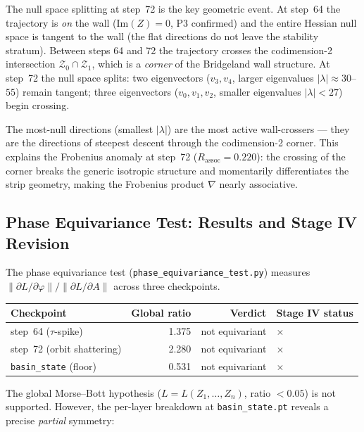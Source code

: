 \documentclass[11pt]{amsart}
\begin{document}
The null space splitting at step~72 is the key geometric event.
At step~64 the trajectory is \emph{on} the wall (Im$(Z)=0$, P3 confirmed)
and the entire Hessian null space is tangent to the wall (the flat
directions do not leave the stability stratum).
Between steps 64 and 72 the trajectory crosses the codimension-2
intersection $\mathcal{Z}_0 \cap \mathcal{Z}_1$, which is a
\emph{corner} of the Bridgeland wall structure.
At step~72 the null space splits: two eigenvectors ($v_3, v_4$,
larger eigenvalues $|\lambda| \approx 30$--$55$) remain tangent;
three eigenvectors ($v_0, v_1, v_2$, smaller eigenvalues $|\lambda| < 27$)
begin crossing.

The most-null directions (smallest $|\lambda|$) are the most active
wall-crossers — they are the directions of steepest descent through the
codimension-2 corner.
This explains the Frobenius anomaly at step~72 ($R_\mathrm{assoc} = 0.220$):
the crossing of the corner breaks the generic isotropic structure
and momentarily differentiates the strip geometry, making
the Frobenius product $\nabla$ nearly associative.

\subsection{Phase Equivariance Test: Results and Stage IV Revision}
\label{sec:phase_equivariance}

The phase equivariance test (\texttt{phase\_equivariance\_test.py})
measures $\|\partial L/\partial\varphi\| / \|\partial L/\partial A\|$
across three checkpoints.

\begin{center}
\small
\begin{tabular}{@{}lrrl@{}}
\toprule
Checkpoint & Global ratio & Verdict & Stage IV status \\
\midrule
step~64 ($\tau$-spike) & 1.375 & not equivariant & $\times$ \\
step~72 (orbit shattering) & 2.280 & not equivariant & $\times$ \\
\texttt{basin\_state} (floor) & 0.531 & not equivariant & $\times$ \\
\bottomrule
\end{tabular}
\end{center}

The global Morse--Bott hypothesis ($L = L(Z_1,\ldots,Z_n)$, ratio $< 0.05$)
is not supported.
However, the per-layer breakdown at \texttt{basin\_state.pt} reveals
a precise \emph{partial} symmetry:
\end{document}

